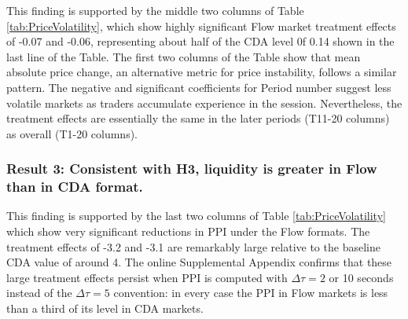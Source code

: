 \documentclass[12pt]{article}
\begin{document}
This finding is supported by the middle two columns of Table \ref{tab:PriceVolatility}, which show highly significant Flow market treatment effects
of -0.07 and -0.06, representing about half of the CDA level 0f 0.14 shown in the last line of the Table. The first two columns of the Table show that mean absolute price change, an alternative metric for price instability, follows a similar pattern.  
The negative and significant coefficients for Period number suggest less volatile markets as traders accumulate experience in the session. 
Nevertheless, the treatment effects are essentially the same in the later periods (T11-20 columns) as overall (T1-20 columns).

\subsubsection*{Result 3: Consistent with H3, liquidity is greater in Flow than in  CDA format.}

This finding is supported by the last two columns of Table \ref{tab:PriceVolatility} which show very significant reductions in PPI under the Flow formats. The treatment effects of -3.2 and -3.1 are remarkably large relative to the baseline CDA value of around 4. 
The online Supplemental Appendix  confirms that 
these large treatment effects persist when PPI 
is computed with $\Delta \tau = 2$ or 10 seconds instead of the $\Delta \tau = 5$ convention: in every case
the PPI in Flow markets is less than a third of its level in CDA markets.
\end{document}
